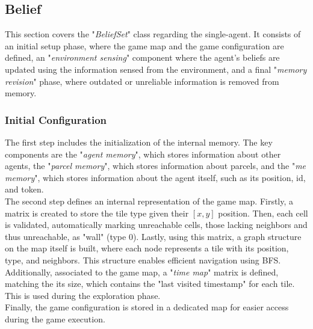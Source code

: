     \subsection{Belief}
        This section covers the "\textit{BeliefSet}" class regarding the single-agent. It consists of an initial setup phase, where the game map and the game configuration are defined, an "\textit{environment sensing}" component where the agent's beliefs are updated using the information sensed from the environment, and a final "\textit{memory revision}" phase, where outdated or unreliable information is removed from memory.

        \subsubsection{Initial Configuration}
            The first step includes the initialization of the internal memory. The key components are the "\textit{agent memory}", which stores information about other agents, the "\textit{parcel memory}", which stores information about parcels, and the "\textit{me memory}", which stores information about the agent itself, such as its position, id, and token.
            \medskip\\
            The second step defines an internal representation of the game map. Firstly, a matrix is created to store the tile type given their $[x, y]$ position. Then, each cell is validated, automatically marking unreachable cells, those lacking neighbors and thus unreachable, as "wall" (type $0$). Lastly, using this matrix, a graph structure on the map itself is built, where each node represents a tile with its position, type, and neighbors. This structure enables efficient navigation using BFS. Additionally, associated to the game map, a "\textit{time map}" matrix is defined, matching the its size, which contains the "last visited timestamp" for each tile. This is used during the exploration phase.
            \medskip\\
            Finally, the game configuration is stored in a dedicated map for easier access during the game execution.

